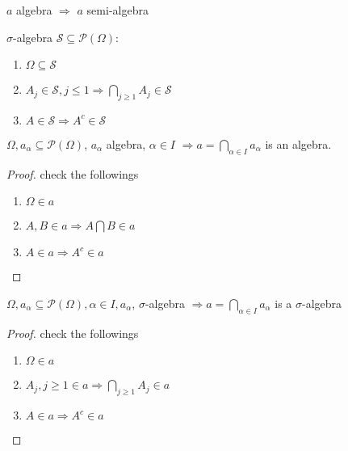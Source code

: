 \begin{remark}
	$ a $ algebra $ \Rightarrow $ $ a $ semi-algebra
\end{remark}

\begin{definition}
	$ \sigma$-algebra $ \mathcal{S} \subseteq \mathcal{P}\left(\Omega\right) $:
	\begin{enumerate}
		\item $ \Omega \subseteq \mathcal{S} $
		\item $ A_{j} \in \mathcal{S}, j\le 1 \Rightarrow \bigcap\limits_{j \geqslant 1} {{A_j}}  \in \mathcal{S} $
		\item $ A \in \mathcal{S} \Rightarrow {A^c} \in \mathcal{S}$
	\end{enumerate}
\end{definition}

\begin{remark}
	$ \Omega, a_{\alpha} \subseteq \mathcal{P}\left(\Omega\right) $, $ a_{\alpha} $ algebra, $ \alpha \in I $ $ \Rightarrow a = \bigcap\limits_{\alpha  \in I} {{a_\alpha }} $ is an algebra.
\end{remark}

\begin{proof}
	check the followings
	\begin{enumerate}
		\item $ \Omega \in a  $
		\item $ A,B \in a \Rightarrow A \bigcap B \in a $
		\item $ A \in a \Rightarrow A^{c} \in a $
	\end{enumerate}
\end{proof}

\begin{remark}
	$ \Omega, a_{\alpha} \subseteq \mathcal{P}\left(\Omega\right), \alpha \in I, a_{\alpha} $, $ \sigma $-algebra $ \Rightarrow a = \bigcap\limits_{\alpha  \in I} {{a_\alpha }} $  is a $ \sigma $-algebra
\end{remark}

\begin{proof}
	check the followings
	\begin{enumerate}
		\item $ \Omega \in a  $
		\item $ A_{j}, j \ge 1 \in a \Rightarrow \bigcap\limits_{j \geqslant 1} {{A_j}}  \in a$
		\item $ A \in a \Rightarrow A^{c} \in a $
\end{enumerate}
\end{proof}

